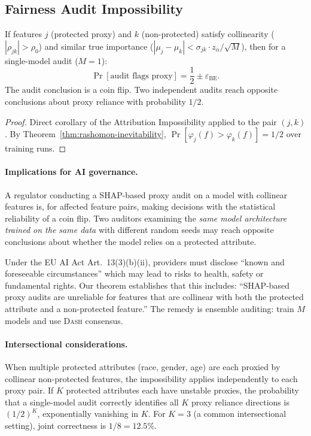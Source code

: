 \documentclass{jmlr}
\newcommand{\DASH}{\textsc{Dash}}
\begin{document}
\subsection{Fairness Audit Impossibility}
\label{sec:fairness}

\begin{theorem}
\label{thm:fairness-audit}
If features $j$ (protected proxy) and $k$ (non-protected) satisfy collinearity ($|\rho_{jk}| > \rho_0$) and similar true importance ($|\mu_j - \mu_k| < \sigma_{jk} \cdot z_\alpha / \sqrt{M}$), then for a single-model audit ($M{=}1$):
\[
    \Pr[\text{audit flags proxy}] = \frac{1}{2} \pm \varepsilon_{\text{BE}}.
\]
The audit conclusion is a coin flip. Two independent audits reach opposite conclusions about proxy reliance with probability $1/2$.
\end{theorem}

\begin{proof}
Direct corollary of the Attribution Impossibility applied to the pair $(j, k)$. By Theorem~\ref{thm:rashomon-inevitability}, $\Pr[\varphi_j(f) > \varphi_k(f)] = 1/2$ over training runs.
\end{proof}

\paragraph{Implications for AI governance.}
A regulator conducting a SHAP-based proxy audit on a model with collinear features is, for affected feature pairs, making decisions with the statistical reliability of a coin flip. Two auditors examining the \emph{same model architecture trained on the same data} with different random seeds may reach opposite conclusions about whether the model relies on a protected attribute.

Under the EU AI Act Art.~13(3)(b)(ii), providers must disclose ``known and foreseeable circumstances'' which may lead to risks to health, safety or fundamental rights. Our theorem establishes that this includes: ``SHAP-based proxy audits are unreliable for features that are collinear with both the protected attribute and a non-protected feature.'' The remedy is ensemble auditing: train $M$ models and use \DASH{} consensus.

\paragraph{Intersectional considerations.}
When multiple protected attributes (race, gender, age) are each proxied by collinear non-protected features, the impossibility applies independently to each proxy pair. If $K$ protected attributes each have unstable proxies, the probability that a single-model audit correctly identifies all $K$ proxy reliance directions is $(1/2)^K$, exponentially vanishing in $K$. For $K = 3$ (a common intersectional setting), joint correctness is $1/8 = 12.5\%$.
\end{document}
